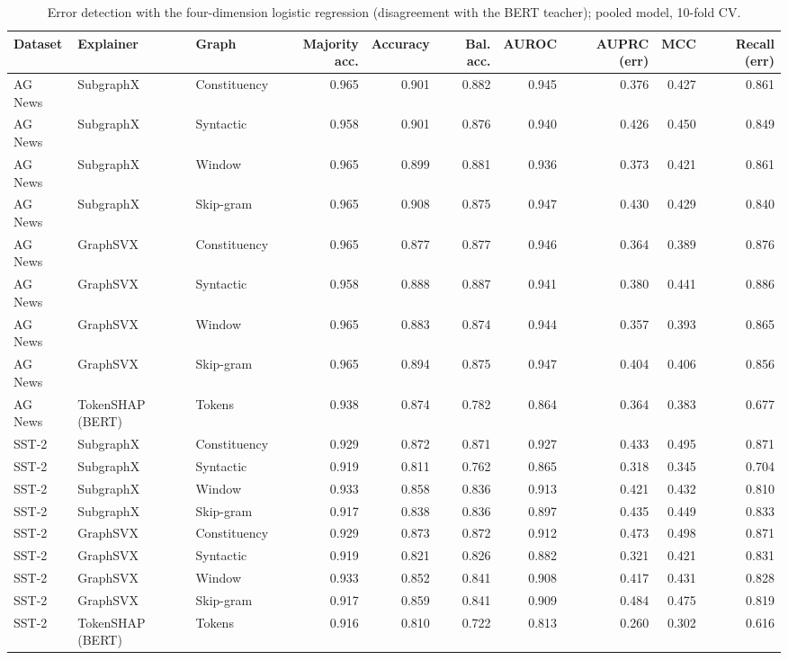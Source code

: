 \begin{table}[H]
\centering
\small
\caption{Error detection with the four-dimension logistic regression (disagreement with the BERT teacher); pooled model, 10-fold CV.}
\label{tab:lr_teacher_agreement}
\begin{tabular}{lllrrrrrrr}
\toprule
Dataset & Explainer & Graph & Majority acc. & Accuracy & Bal. acc. & AUROC & AUPRC (err) & MCC & Recall (err) \\
\midrule
AG News & SubgraphX & Constituency & 0.965 & 0.901 & 0.882 & 0.945 & 0.376 & 0.427 & 0.861 \\
AG News & SubgraphX & Syntactic & 0.958 & 0.901 & 0.876 & 0.940 & 0.426 & 0.450 & 0.849 \\
AG News & SubgraphX & Window & 0.965 & 0.899 & 0.881 & 0.936 & 0.373 & 0.421 & 0.861 \\
AG News & SubgraphX & Skip-gram & 0.965 & 0.908 & 0.875 & 0.947 & 0.430 & 0.429 & 0.840 \\
AG News & GraphSVX & Constituency & 0.965 & 0.877 & 0.877 & 0.946 & 0.364 & 0.389 & 0.876 \\
AG News & GraphSVX & Syntactic & 0.958 & 0.888 & 0.887 & 0.941 & 0.380 & 0.441 & 0.886 \\
AG News & GraphSVX & Window & 0.965 & 0.883 & 0.874 & 0.944 & 0.357 & 0.393 & 0.865 \\
AG News & GraphSVX & Skip-gram & 0.965 & 0.894 & 0.875 & 0.947 & 0.404 & 0.406 & 0.856 \\
AG News & TokenSHAP (BERT) & Tokens & 0.938 & 0.874 & 0.782 & 0.864 & 0.364 & 0.383 & 0.677 \\
SST-2 & SubgraphX & Constituency & 0.929 & 0.872 & 0.871 & 0.927 & 0.433 & 0.495 & 0.871 \\
SST-2 & SubgraphX & Syntactic & 0.919 & 0.811 & 0.762 & 0.865 & 0.318 & 0.345 & 0.704 \\
SST-2 & SubgraphX & Window & 0.933 & 0.858 & 0.836 & 0.913 & 0.421 & 0.432 & 0.810 \\
SST-2 & SubgraphX & Skip-gram & 0.917 & 0.838 & 0.836 & 0.897 & 0.435 & 0.449 & 0.833 \\
SST-2 & GraphSVX & Constituency & 0.929 & 0.873 & 0.872 & 0.912 & 0.473 & 0.498 & 0.871 \\
SST-2 & GraphSVX & Syntactic & 0.919 & 0.821 & 0.826 & 0.882 & 0.321 & 0.421 & 0.831 \\
SST-2 & GraphSVX & Window & 0.933 & 0.852 & 0.841 & 0.908 & 0.417 & 0.431 & 0.828 \\
SST-2 & GraphSVX & Skip-gram & 0.917 & 0.859 & 0.841 & 0.909 & 0.484 & 0.475 & 0.819 \\
SST-2 & TokenSHAP (BERT) & Tokens & 0.916 & 0.810 & 0.722 & 0.813 & 0.260 & 0.302 & 0.616 \\
\bottomrule
\end{tabular}
\end{table}


